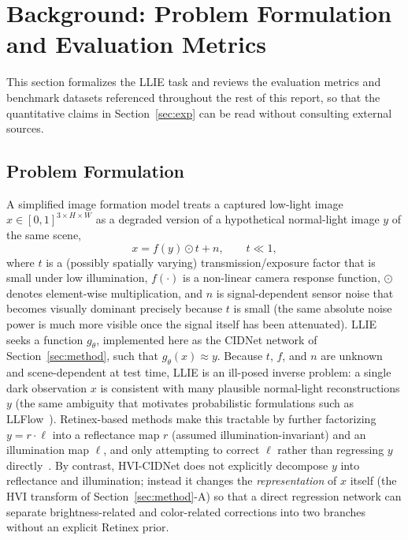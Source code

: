 \documentclass[conference]{IEEEtran}
\begin{document}
\section{Background: Problem Formulation and Evaluation Metrics}
\label{sec:background}

This section formalizes the LLIE task and reviews the evaluation metrics and
benchmark datasets referenced throughout the rest of this report, so that the
quantitative claims in Section~\ref{sec:exp} can be read without consulting
external sources.

\subsection{Problem Formulation}
A simplified image formation model treats a captured low-light image
$x \in [0,1]^{3\times H\times W}$ as a degraded version of a hypothetical
normal-light image $y$ of the same scene,
\begin{equation}
x = f(y) \odot t + n, \qquad t \ll 1,
\end{equation}
where $t$ is a (possibly spatially varying) transmission/exposure factor
that is small under low illumination, $f(\cdot)$ is a non-linear camera
response function, $\odot$ denotes element-wise multiplication, and $n$ is
signal-dependent sensor noise that becomes visually dominant precisely
because $t$ is small (the same absolute noise power is much more visible
once the signal itself has been attenuated). LLIE seeks a function
$g_\theta$, implemented here as the CIDNet network of
Section~\ref{sec:method}, such that $g_\theta(x) \approx y$. Because $t$,
$f$, and $n$ are unknown and scene-dependent at test time, LLIE is an
ill-posed inverse problem: a single dark observation $x$ is consistent with
many plausible normal-light reconstructions $y$ (the same ambiguity that
motivates probabilistic formulations such as LLFlow~\cite{wang2022llflow}).
Retinex-based methods make this tractable by further factorizing
$y = r \cdot \ell$ into a reflectance map $r$ (assumed illumination-invariant)
and an illumination map $\ell$, and only attempting to correct $\ell$ rather
than regressing $y$ directly~\cite{wei2018retinexnet,zhang2019kindling}. By
contrast, HVI-CIDNet does not explicitly decompose $y$ into reflectance and
illumination; instead it changes the \emph{representation} of $x$ itself (the
HVI transform of Section~\ref{sec:method}-A) so that a direct regression
network can separate brightness-related and color-related corrections into
two branches without an explicit Retinex prior.
\end{document}
